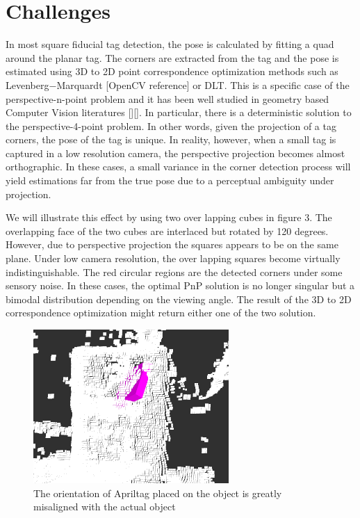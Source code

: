 \section{Challenges}
\label{sec:problem}
In most square fiducial tag detection, the pose is calculated by fitting a quad around the planar tag. The corners are extracted from the tag and the pose is estimated using 3D to 2D point correspondence optimization methods such as Levenberg$-$Marquardt [OpenCV reference] or DLT. This is a specific case of the perspective-n-point problem and it has been well studied in geometry based Computer Vision literatures [][]. In particular, there is a deterministic solution to the perspective-4-point problem. In other words, given the projection of a tag corners, the pose of the tag is unique. In reality, however,  when a small tag is captured in a low resolution camera, the perspective projection becomes almost orthographic. In these cases, a small variance in the corner detection process will yield estimations far from the true pose due to a perceptual ambiguity under projection. 

We will illustrate this effect by using two over lapping cubes in figure 3. The overlapping face of the two cubes are interlaced but rotated by 120 degrees. However, due to perspective projection the squares appears to be on the same plane. Under low camera resolution, the over lapping squares become virtually indistinguishable. The red circular regions are the detected corners under some sensory noise. In these cases, the optimal PnP solution is no longer singular but a bimodal distribution depending on the viewing angle. The result of the 3D to 2D correspondence optimization might return either one of the two solution.
\begin{figure}
\centering
\includegraphics[width=\columnwidth]{figs/mismatch_tag}
\caption{The orientation of Apriltag placed on the object is greatly misaligned with the actual object}
\label{fig:calib}
\end{figure}

